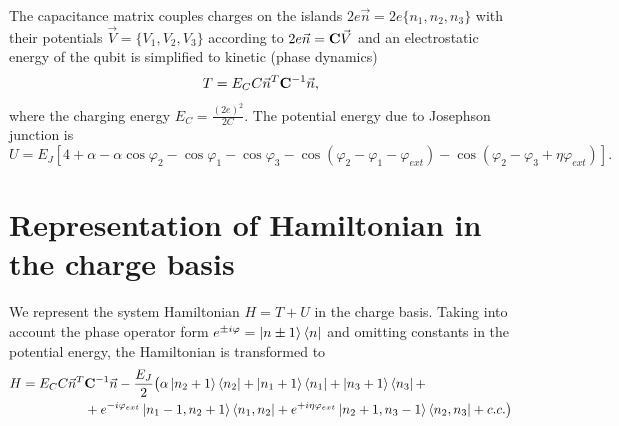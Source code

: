 \documentclass[%
superscriptaddress,
preprint,
preprintnumbers,
bibnotes,
amsmath,
amssymb,
aps,
showkeys,
prb,
]{revtex4-1}
\newcommand{\iabs}[1]{\ensuremath{\left|#1\right|}}
\begin{document}
The capacitance matrix couples charges on the islands $2e\vec{n} = 2e\{ n_1, n_2, n_3\}$ with their potentials $\vec{V} = \{ V_1, V_2, V_3\}$ according to $2e\vec{n} = \bold{C} \vec{V}$ and an electrostatic energy of the qubit is simplified to kinetic (phase dynamics) 
\begin{equation}
T= E_C C \vec{n}^T \bold{C}^{-1} \vec{n}, 
\end{equation}
where the charging energy $E_C = \frac{(2e)^2}{2C}$. The potential energy due to Josephson junction is 
\begin{equation}
U = E_J [4 + \alpha - \alpha \cos{\varphi_2} - \cos{\varphi_1} - \cos{\varphi_3} - \cos{(\varphi_2 - \varphi_1 - \varphi_{ext})} - \cos{(\varphi_2 - \varphi_3 + \eta \varphi_{ext})}].  
\end{equation}

\section{Representation of Hamiltonian in the charge basis}
\label{sec:repr-hamilt-charge}

We represent the system Hamiltonian $H=T+U$ in the charge basis.  
Taking into account the phase operator form $e^{\pm i\varphi} = \ket{n\pm 1}\bra{n}$ and omitting constants in the potential energy, the Hamiltonian is transformed to 
\begin{align}
H = E_C C \vec{n}^T &\bold{C}^{-1} \vec{n} -\frac{E_J}{2}\big(\alpha\ket{n_2+1}\bra{n_2}+\ket{n_1+1}\bra{n_1}+ \ket{n_3+1}\bra{n_3} + \nonumber\\
       & + e^{-i\varphi_{ext}}\ket{n_1-1,n_2+1}\bra{n_1,n_2} + e^{+i\eta\varphi_{ext}}\ket{n_2+1,n_3-1}\bra{n_2,n_3} + c.c. \big)
\end{align}


%
%
\end{document}
